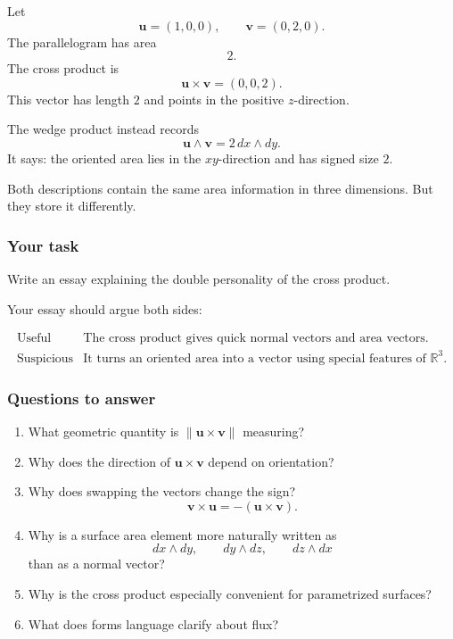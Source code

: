 Let
\[
    \mathbf u=(1,0,0),
    \qquad
    \mathbf v=(0,2,0).
\]
The parallelogram has area
\[
    2.
\]
The cross product is
\[
    \mathbf u\times\mathbf v=(0,0,2).
\]
This vector has length \(2\) and points in the positive \(z\)-direction.

The wedge product instead records
\[
    \mathbf u\wedge\mathbf v=2\,dx\wedge dy.
\]
It says: the oriented area lies in the \(xy\)-direction and has signed size \(2\).

Both descriptions contain the same area information in three dimensions.  But they
store it differently.

\subsubsection*{Your task}

Write an essay explaining the double personality of the cross product.

Your essay should argue both sides:

\[
\begin{array}{c|l}
\text{Useful} & \text{The cross product gives quick normal vectors and area vectors.}\\[1mm]
\text{Suspicious} & \text{It turns an oriented area into a vector using special features of } \mathbb R^3.
\end{array}
\]

\subsubsection*{Questions to answer}

\begin{enumerate}
\item What geometric quantity is \(\|\mathbf u\times\mathbf v\|\) measuring?

\item Why does the direction of \(\mathbf u\times\mathbf v\) depend on orientation?

\item Why does swapping the vectors change the sign?
\[
    \mathbf v\times\mathbf u=-(\mathbf u\times\mathbf v).
\]

\item Why is a surface area element more naturally written as
\[
    dx\wedge dy,\qquad dy\wedge dz,\qquad dz\wedge dx
\]
than as a normal vector?

\item Why is the cross product especially convenient for parametrized surfaces?

\item What does forms language clarify about flux?
\end{enumerate}

